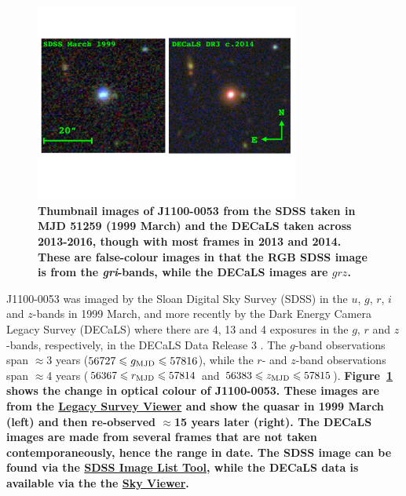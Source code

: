 \documentclass[a4paper,fleqn,usenatbib]{mnras}
\begin{document}
\begin{figure}
  \centering
  \includegraphics[width=8.7cm, trim=0.0cm 0.0cm 0.0cm 0.0cm, clip]
  {../images/J1100_0053_thumbnails.pdf}
  \vspace{-16pt}
  \caption[]{{\bf Thumbnail images of J1100-0053 from the SDSS taken
in MJD 51259 (1999 March) and the DECaLS taken across 2013-2016, though with most
frames in 2013 and 2014.  
These are false-colour images in that the RGB SDSS image is from 
the {\it gri}-bands, while the DECaLS images are $grz$. }
}
\vspace{-12pt}
\label{fig:J110057_thumbnails}
\end{figure}

J1100-0053 was imaged by the Sloan Digital Sky Survey (SDSS) in the
$u$, $g$, $r$, $i$ and $z$-bands in 1999 March, and more recently by
the Dark Energy Camera Legacy Survey (DECaLS) where there are 4, 13
and 4 exposures in the $g$, $r$ and $z$-bands, respectively, in the
DECaLS Data Release 3 \citep[DR3; ][]{Dey2018}. The $g$-band
observations span $\approx$3 years ($56727 \leq g_{\rm MJD} \leq
57816$), while the $r$- and $z$-band observations span $\approx$4
years ($56367 \leq r_{\rm MJD} \leq 57814$ and $56383 \leq z_{\rm MJD}
\leq 57815$). {\bf Figure~\ref{fig:J110057_thumbnails} shows the
change in optical colour of J1100-0053. These images are from the
\href{legacysurvey.org/viewer}{Legacy Survey Viewer} and show the
quasar in 1999 March (left) and then re-observed $\approx$15 years
later (right).  The DECaLS images are made from several frames that
are not taken contemporaneously, hence the range in date.  The SDSS
image can be found via the
\href{https://skyserver.sdss.org/dr14/en/tools/chart/navi.aspx?ra=165.240463&dec=-0.884586&scale=0.2&width=120&height=120&opt=}{SDSS
Image List Tool}, while the DECaLS data is available via the the
\href{http://legacysurvey.org/viewer/data-for-radec/?ra=165.2404&dec=-0.8847&layer=decals-dr3}{Sky
Viewer}.}
\end{document}
